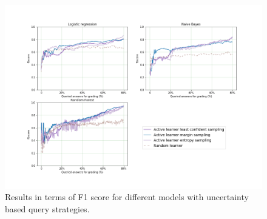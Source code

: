 \begin{figure}[!htb]
	\centering
	\includegraphics[scale=0.45]{images/task5_f1score_uncertainty}
	\caption{Results in terms of F1 score for different models with uncertainty based query strategies.}
	\label{t5_m_uncertainty_f1}
\end{figure}


